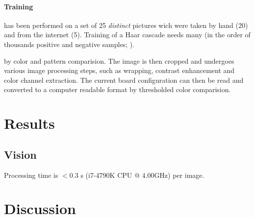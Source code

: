 \documentclass[10pt,twocolumn,letterpaper]{article}
\begin{document}
\paragraph{Training} has been performed on a set of 25 \textit{distinct} pictures wich were taken by hand (20) and from the internet (5).
Training of a Haar cascade needs many (in the order of thousands positive and negative samples;  \cite{kuranov}).




 by color and pattern comparision.
The image is then cropped and undergoes various image processing steps, such as wrapping, contrast enhancement and color channel extraction.
The current board configuration can then be read and converted to a computer readable format by thresholded color comparision.




\section{Results}

\subsection{Vision}
Processing time is $< 0.3$ s (i7-4790K CPU @ 4.00GHz) per image.


\section{Discussion}

{\small
\printbibliography
}
\end{document}
